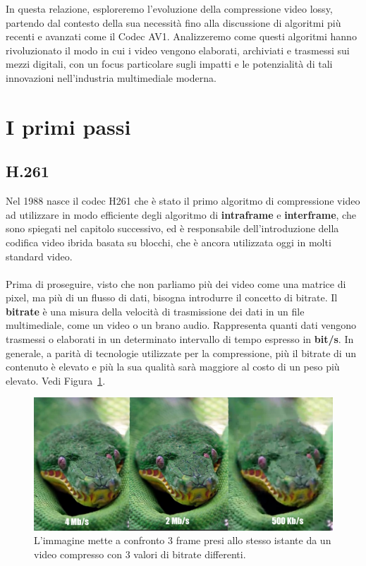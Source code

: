 \documentclass[a4paper,12pt, oneside]{article}
\begin{document}
In questa relazione, esploreremo l'evoluzione della compressione video lossy, partendo dal
contesto della sua necessità fino alla discussione di algoritmi più recenti e avanzati come il
Codec AV1. Analizzeremo come questi algoritmi hanno rivoluzionato il modo in cui i video
vengono elaborati, archiviati e trasmessi sui mezzi digitali, con un focus particolare sugli
impatti e le potenzialità di tali innovazioni nell'industria multimediale moderna.

\section{I primi passi}
\subsection{H.261}
Nel 1988 nasce il codec H261 che è stato il primo algoritmo di compressione video ad utilizzare
in modo efficiente degli algoritmo di \textbf{intraframe} e \textbf{interframe}, che sono
spiegati nel capitolo successivo, ed è responsabile dell'introduzione della codifica video
ibrida basata su blocchi, che è ancora utilizzata oggi in molti standard video.
\\\\Prima di proseguire, visto che non parliamo più dei video come una matrice di pixel, ma più di
un flusso di dati, bisogna introdurre il concetto di bitrate.
Il \textbf{bitrate} è una misura della velocità di trasmissione dei dati in un file multimediale,
come un video o un brano audio. Rappresenta quanti dati vengono trasmessi o elaborati in un
determinato intervallo di tempo espresso in \textbf{bit/s}. In generale, a parità di tecnologie
utilizzate per la compressione, più il bitrate di un contenuto è elevato e più la sua qualità
sarà maggiore al costo di un peso più elevato. Vedi Figura~\ref{fig:confronto_bitrate}.

\begin{figure}[h]
    \centering
    \includegraphics[width=1\textwidth]{images/confronto-bitrate.png}
    \caption{L'immagine mette a confronto 3 frame presi allo stesso istante da un video compresso con 3 valori di bitrate differenti.}
    \label{fig:confronto_bitrate}
\end{figure}
\end{document}
